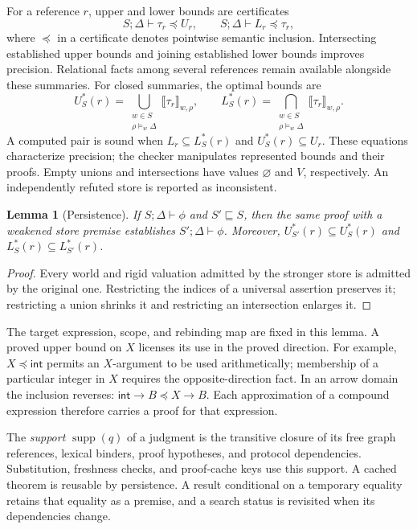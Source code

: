 \documentclass[10pt,a4paper]{article}
\newcommand{\sem}[1]{\llbracket #1\rrbracket}
\newcommand{\supp}{\operatorname{supp}}
\newcommand{\Int}{\mathsf{int}}
\newtheorem{lemma}[definition]{Lemma}
\theoremstyle{remark}
\newcounter{example}[section]
\begin{document}
For a reference $r$, upper and lower bounds are certificates
\begin{equation}\label{eq:bounds}
 S;\Delta\vdash\tau_r\preceq U_r,
 \qquad
 S;\Delta\vdash L_r\preceq\tau_r,
\end{equation}
where $\preceq$ in a certificate denotes pointwise semantic inclusion.
Intersecting established upper bounds and joining established lower bounds
improves precision. Relational facts among several references remain available
alongside these summaries. For closed summaries, the optimal bounds are
\[
 U^*_S(r)=\bigcup_{\substack{w\in S\\\rho\models_w\Delta}}
                 \sem{\tau_r}_{w,\rho},\qquad
 L^*_S(r)=\bigcap_{\substack{w\in S\\\rho\models_w\Delta}}
                 \sem{\tau_r}_{w,\rho}.
\]
A computed pair is sound when $L_r\subseteq L^*_S(r)$ and
$U^*_S(r)\subseteq U_r$. These equations characterize precision; the checker
manipulates represented bounds and their proofs. Empty unions and intersections
have values $\varnothing$ and $V$, respectively. An independently refuted store
is reported as inconsistent.

\begin{lemma}[Persistence]\label{lem:persistence}
If $S;\Delta\vdash\phi$ and $S'\sqsubseteq S$, then the same proof with a
weakened store premise establishes $S';\Delta\vdash\phi$. Moreover,
$U^*_{S'}(r)\subseteq U^*_S(r)$ and $L^*_S(r)\subseteq L^*_{S'}(r)$.
\end{lemma}
\begin{proof}
Every world and rigid valuation admitted by the stronger store is admitted by
the original one. Restricting the indices of a universal assertion preserves
it; restricting a union shrinks it and restricting an intersection enlarges it.
\end{proof}

The target expression, scope, and rebinding map are fixed in this lemma.
A proved upper bound on $X$ licenses its use in the proved direction. For
example, $X\preceq\Int$ permits an $X$-argument to be used arithmetically;
membership of a particular integer in $X$ requires the opposite-direction
fact. In an arrow domain the inclusion reverses:
$\Int\to B\preceq X\to B$. Each approximation of a compound expression
therefore carries a proof for that expression.

The \emph{support} $\supp(q)$ of a judgment is the transitive closure of its
free graph references, lexical binders, proof hypotheses, and protocol
dependencies. Substitution, freshness checks, and proof-cache keys use this
support. A cached theorem is reusable by persistence. A result conditional on
a temporary equality retains that equality as a premise, and a search status
is revisited when its dependencies change.
\end{document}

